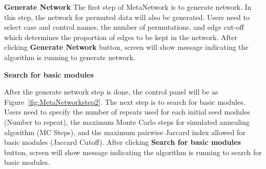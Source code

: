 \begin{steps}
\item \textbf{Generate Network}
The first step of MetaNetwork is to generate network. In this step, the network for permuted data will also be generated. Users need to select case and control names, the number of permutations, and edge cut-off which determines the proportion of edges to be kept in the network. After clicking \textbf{Generate Network} button, screen will show message indicating the algorithm is running to generate network.


\item \textbf{Search for basic modules}

After the generate network step is done, the control panel will be as Figure~\ref{fig:MetaNetworkstep2}. The next step is to search for basic modules. Users need to specify the number of repeats used for each initial seed modules (Number to repeat), the maximum Monte Carlo steps for simulated annealing algorithm (MC Steps), and the maximum pairwise Jaccard index allowed for basic modules (Jaccard Cutoff). After clicking \textbf{Search for basic modules} button, screen will show message indicating the algorithm is running to search for basic modules.


\end{steps}
